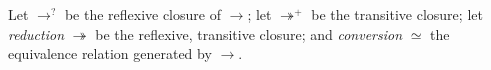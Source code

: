 \begin{definition}
\begin{code}
\\
\> \AgdaSymbol{(} \AgdaSymbol{\_} \AgdaSymbol{\_)} \AgdaSymbol{(} \AgdaSymbol{\_} \AgdaSymbol{\_)} \AgdaSymbol{=} \<%
\\
\> \AgdaSymbol{(} \AgdaSymbol{\_} \AgdaSymbol{\_)} \AgdaSymbol{(} \AgdaSymbol{\_} \AgdaSymbol{\_)} \AgdaSymbol{=} \<%
\\
\> \AgdaSymbol{(} \AgdaSymbol{\_} \AgdaSymbol{\_)} \AgdaSymbol{(} \AgdaSymbol{\_} \AgdaSymbol{\_)} \AgdaSymbol{=} \<%
\\
\> \AgdaSymbol{(} \AgdaSymbol{\_} \AgdaSymbol{\_)} \AgdaSymbol{(} \AgdaSymbol{\_} \AgdaSymbol{\_} \AgdaSymbol{\_} \AgdaSymbol{\_} \AgdaSymbol{())}\<%
\\
\> \AgdaSymbol{(} \AgdaSymbol{\_} \AgdaSymbol{\_} \AgdaSymbol{\_} \AgdaSymbol{\_)} \AgdaSymbol{(} \AgdaSymbol{\_} \AgdaSymbol{\_} \AgdaSymbol{\_} \AgdaSymbol{\_)} \AgdaSymbol{=} \<%
\\
\> \AgdaSymbol{(} \AgdaSymbol{\_} \AgdaSymbol{\_} \AgdaSymbol{\_} \AgdaSymbol{\_} \AgdaSymbol{\_)} \AgdaSymbol{(} \AgdaSymbol{\_} \AgdaSymbol{\_} \AgdaSymbol{\_} \AgdaSymbol{\_} \AgdaSymbol{\_)} \AgdaSymbol{=} \<%
\\
\> \AgdaSymbol{(} \AgdaSymbol{\_} \AgdaSymbol{\_} \AgdaSymbol{\_} \AgdaSymbol{\_} \AgdaSymbol{())} \AgdaSymbol{(} \AgdaSymbol{\_} \AgdaSymbol{\_)}\<%
\end{code}

Let $\rightarrow^?$ be the reflexive closure of $\rightarrow$;
let $\twoheadrightarrow^+$ be the transitive closure;
let \emph{reduction} $\twoheadrightarrow$ be the reflexive, transitive closure; and \emph{conversion} $\simeq$ the equivalence relation generated by $\rightarrow$.
\end{definition}

